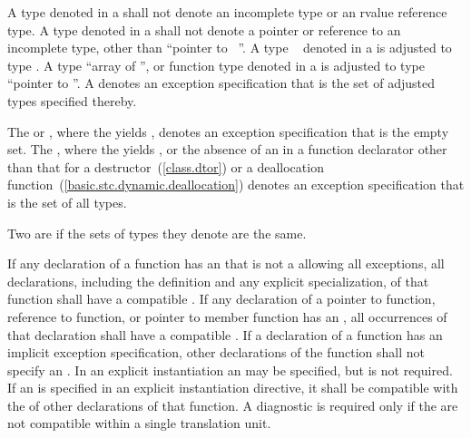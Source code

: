 \pnum
{}%
A type denoted
in a 
shall not denote an incomplete type or an rvalue reference type.
A type denoted
in a 
shall not denote a pointer or reference to an incomplete type, other than
``pointer to \cv\ ''.
A type
\cv\ 
denoted in a 
is adjusted to type .
A type
``array of '', or
function type 
denoted in a 
is adjusted to type
``pointer to ''.
A 
denotes an exception specification
that is the set of adjusted types specified thereby.

\pnum
The 
 or \tcode{)},
where the  yields ,
denotes an exception specification
that is the empty set.
The 
\tcode{)},
where the  yields ,
or the absence of an 
in a function declarator other than that
for a destructor~(\ref{class.dtor})
or a deallocation function~(\ref{basic.stc.dynamic.deallocation})
denotes an exception specification
that is the set of all types.

\pnum
{}%
Two  are
 if
the sets of types they denote are the same.

\pnum
If any declaration of a function has an
that is not a  allowing all exceptions,
all declarations, including the definition and any explicit specialization,
of that function shall have a compatible
.
If any declaration of a pointer to function, reference to function,
or pointer to member function has an
,
all occurrences of that declaration shall have a compatible
.
If a declaration of a function has an implicit
exception specification,
other declarations of the function shall not specify an
.
In an explicit instantiation an
may be specified, but is not required.
If an
is specified in an explicit instantiation directive, it shall
be compatible with the  of
other declarations of that function.
A diagnostic is required only if the
 are not compatible
within a single translation unit.

